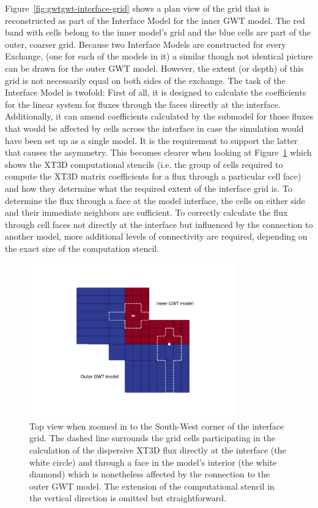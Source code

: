 Figure~\ref{fig:gwtgwt-interface-grid} shows a plan view of the grid that is reconstructed as part of the Interface Model for the inner GWT model. The red band with cells belong to the inner model’s grid and the blue cells are part of the outer, coarser grid. Because two Interface Models are constructed for every Exchange, (one for each of the models in it) a similar though not identical picture can be drawn for the outer GWT model. However, the extent (or depth) of this grid is not necessarily equal on both sides of the exchange. The task of the Interface Model is twofold: First of all, it is designed to calculate the coefficients for the linear system for fluxes through the faces directly at the interface. Additionally, it can amend coefficients calculated by the submodel for those fluxes that would be affected by cells across the interface in case the simulation would have been set up as a single model. It is the requirement to support the latter that causes the asymmetry. This becomes clearer when looking at Figure~\ref{fig:gwtgwt-stencils} which shows the XT3D computational stencils (i.e. the group of cells required to compute the XT3D matrix coefficients for a flux through a particular cell face) and how they determine what the required extent of the interface grid is. To determine the flux through a face at the model interface, the cells on either side and their immediate neighbors are sufficient. To correctly calculate the flux through cell faces not directly at the interface but influenced by the connection to another model, more additional levels of connectivity are required, depending on the exact size of the computation stencil.

\begin{figure}[!ht]
	\begin{center}
	\includegraphics[width=0.8\textwidth]{./Figures/InterfaceModel/gwt-ifmod-stencils.png}
	\caption[Stencil size and the extent of the Interface Model grid]{Top view when zoomed in to the South-West corner of the interface grid. The dashed line surrounds the grid cells participating in the calculation of the dispersive XT3D flux directly at the interface (the white circle) and through a face in the model’s interior (the white diamond) which is nonetheless affected by the connection to the outer GWT model. The extension of the computational stencil in the vertical direction is omitted but straightforward.}
	\label{fig:gwtgwt-stencils}
	\end{center}
\end{figure}

